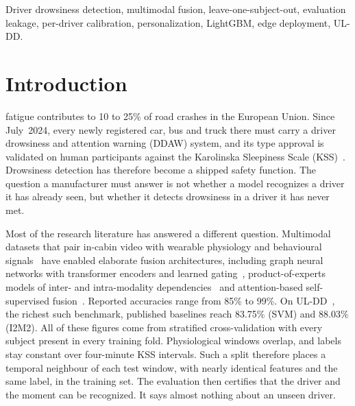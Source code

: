 \documentclass[journal]{IEEEtran}
\begin{document}
\begin{IEEEkeywords}
Driver drowsiness detection, multimodal fusion, leave-one-subject-out,
evaluation leakage, per-driver calibration, personalization, LightGBM,
edge deployment, UL-DD.
\end{IEEEkeywords}

\section{Introduction}
 fatigue contributes to 10 to 25\% of road crashes in
the European Union. Since July~2024, every newly registered car, bus and truck
there must carry a driver drowsiness and attention warning (DDAW) system, and
its type approval is validated on human participants against the Karolinska
Sleepiness Scale (KSS)~\cite{eu2021ddaw,akerstedt1990kss}. Drowsiness
detection has therefore become a shipped safety function. The question a
manufacturer must answer is not whether a model recognizes a driver it has
already seen, but whether it detects drowsiness in a driver it has never met.

Most of the research literature has answered a different question.
Multimodal datasets that pair in-cabin video with wearable physiology and
behavioural signals~\cite{bodaghi2026uldd,ortega2020dmd,massoz2016drozy} have
enabled elaborate fusion architectures, including graph neural networks with
transformer encoders and learned gating~\cite{zendehbad2025fatiguenet},
product-of-experts models of inter- and intra-modality
dependencies~\cite{madaan2024i2m2} and attention-based self-supervised
fusion~\cite{mou2023isotropic}. Reported accuracies range from 85\% to 99\%.
On UL-DD~\cite{bodaghi2026uldd}, the richest such benchmark, published
baselines reach 83.75\% (SVM) and 88.03\% (I2M2). All of these figures come
from stratified cross-validation with every subject present in every training
fold. Physiological windows overlap, and labels stay constant over four-minute
KSS intervals. Such a split therefore places a temporal neighbour of each test
window, with nearly identical features and the same label, in the training
set. The evaluation then certifies that the driver and the moment can be
recognized. It says almost nothing about an unseen driver.
\end{document}

